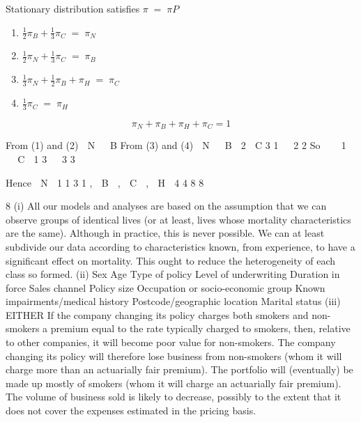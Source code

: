 \documentclass[a4paper,12pt]{article}
\begin{document}
\begin{enumerate}
Stationary distribution satisfies $\pi \;=\; \pi P$

\begin{enumerate}
\item ${\displaystyle
\frac{1}{2} \pi_B + \frac{1}{3}\pi_C \;=\; \pi_N }$

\item ${\displaystyle
\frac{1}{2} \pi_N + \frac{1}{3}\pi_C \;=\; \pi_B }$

\item ${\displaystyle
\frac{1}{3} \pi_N + \frac{1}{2} \pi_B + \pi_H \;=\; \pi_C }$
\item ${\displaystyle
\frac{1}{3} \pi_C \;=\; \pi_H }$
\end{enumerate}

\[ \pi_N + \pi_B + \pi_H + \pi_C = 1\]


From (1) and (2)
 N   B
From (3) and (4)
 N   B 
2
 C
3
1 
 2 2
So    1    C  1
3 
 3 3


Hence
 N 
1
1
3
1
,  B  ,  C  ,  H 
4
4
8
8


\newpage

8
(i)
All our models and analyses are based on the assumption that we can
observe groups of identical lives (or at least, lives whose mortality characteristics are the same).
Although in practice, this is never possible. We can at least subdivide our data according to characteristics known, from
experience, to have a significant effect on mortality.
This ought to reduce the heterogeneity of each class so formed.
(ii) Sex
Age
Type of policy
Level of underwriting
Duration in force
Sales channel
Policy size
Occupation or socio-economic group
Known impairments/medical history
Postcode/geographic location
Marital status
(iii) EITHER
If the company changing its policy charges both smokers and non-smokers a premium equal to the rate typically charged to smokers, then, relative to other companies, it will become poor value for non-smokers.
The company changing its policy will therefore lose business from non-smokers (whom it will charge more than an actuarially fair premium).
The portfolio will (eventually) be made up mostly of smokers (whom it will charge an actuarially fair premium).
The volume of business sold is likely to decrease, possibly to the extent that it does not cover the expenses estimated in the pricing basis.


\end{enumerate}
\end{document}
